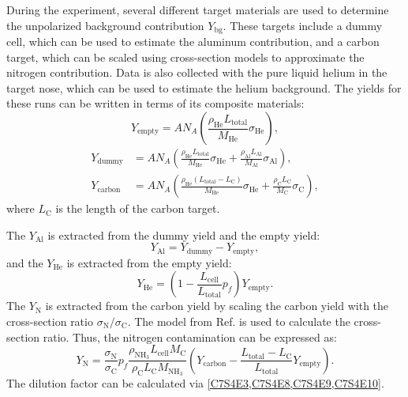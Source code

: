 During the experiment, several different target materials are used to determine the unpolarized background contribution $Y_{\mathrm{bg}}$. These targets include a dummy cell, which can be used to estimate the aluminum contribution, and a carbon target, which can be scaled using cross-section models to approximate the nitrogen contribution. Data is also collected with the pure liquid helium in the target nose, which can be used to estimate the helium background. The yields for these runs can be written in terms of its composite materials:
\begin{equation} \label{C7S4E5}
Y_{\mathrm{empty}} = AN_A\left(\frac{\rho_{\mathrm{He}}L_{\mathrm{total}}}{M_{\mathrm{He}}}\sigma_{\mathrm{He}}\right),
\end{equation}
\begin{align} \label{C7S4E6}
Y_{\mathrm{dummy}} & = AN_A\left(\frac{\rho_{\mathrm{He}}L_{\mathrm{total}}}{M_{\mathrm{He}}}\sigma_{\mathrm{He}}+\frac{\rho_{\mathrm{Al}}L_{\mathrm{Al}}}{M_{\mathrm{Al}}}\sigma_{\mathrm{Al}}\right), \\ \label{C7S4E7}
Y_{\mathrm{carbon}} & = AN_A\left(\frac{\rho_{\mathrm{He}}(L_{\mathrm{total}}-L_{\mathrm{C}})}{M_{\mathrm{He}}}\sigma_{\mathrm{He}}+\frac{\rho_{\mathrm{C}}L_{\mathrm{C}}}{M_{\mathrm{C}}}\sigma_{\mathrm{C}}\right),
\end{align}
where $L_{\mathrm{C}}$ is the length of the carbon target.

The $Y_{\mathrm{Al}}$ is extracted from the dummy yield and the empty yield:
\begin{equation} \label{C7S4E8}
Y_{\mathrm{Al}} = Y_{\mathrm{dummy}}-Y_{\mathrm{empty}},
\end{equation}
and the $Y_{\mathrm{He}}$ is extracted from the empty yield:
\begin{equation} \label{C7S4E9}
Y_{\mathrm{He}} = \left(1-\frac{L_{\mathrm{cell}}}{L_{\mathrm{total}}}p_f\right)Y_{\mathrm{empty}}.
\end{equation}
The $Y_{\mathrm{N}}$ is extracted from the carbon yield by scaling the carbon yield with the cross-section ratio $\sigma_{\mathrm{N}}/\sigma_{\mathrm{C}}$. The model from Ref. \cite{Bosted2008} is used to calculate the cross-section ratio. Thus, the nitrogen contamination can be expressed as:
\begin{equation} \label{C7S4E10}
Y_{\mathrm{N}} = \frac{\sigma_{\mathrm{N}}}{\sigma_{\mathrm{C}}}p_f\frac{\rho_{\mathrm{NH_3}}L_{\mathrm{cell}}M_{\mathrm{C}}}{\rho_{\mathrm{C}}L_{\mathrm{C}}M_{\mathrm{NH_3}}}\left(Y_{\mathrm{carbon}}-\frac{L_{\mathrm{total}}-L_{\mathrm{C}}}{L_{\mathrm{total}}}Y_{\mathrm{empty}}\right).
\end{equation}
The dilution factor can be calculated via \cref{C7S4E3,C7S4E8,C7S4E9,C7S4E10}.

